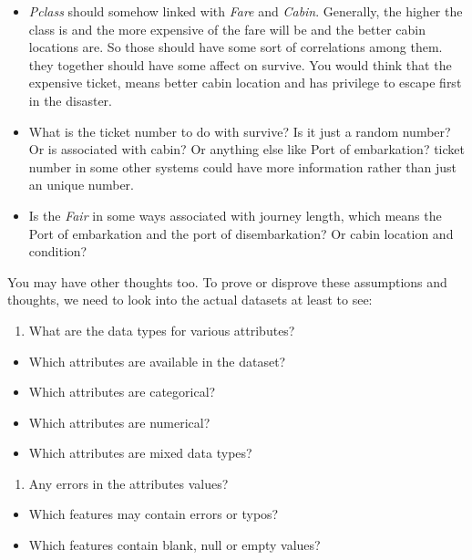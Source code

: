 \documentclass[
]{book}
\providecommand{\tightlist}{%
  \setlength{\itemsep}{0pt}\setlength{\parskip}{0pt}}
\begin{document}
\begin{itemize}
\item
  \emph{Pclass} should somehow linked with \emph{Fare} and \emph{Cabin}. Generally, the higher the class is and the more expensive of the fare will be and the better cabin locations are. So those should have some sort of correlations among them. they together should have some affect on survive. You would think that the expensive ticket, means better cabin location and has privilege to escape first in the disaster.
\item
  What is the ticket number to do with survive? Is it just a random number? Or is associated with cabin? Or anything else like Port of embarkation? ticket number in some other systems could have more information rather than just an unique number.
\item
  Is the \emph{Fair} in some ways associated with journey length, which means the Port of embarkation and the port of disembarkation? Or cabin location and condition?
\end{itemize}

You may have other thoughts too. To prove or disprove these assumptions and thoughts, we need to look into the actual datasets at least to see:

\begin{enumerate}
\def\labelenumi{\arabic{enumi}.}
\tightlist
\item
  What are the data types for various attributes?
\end{enumerate}

\begin{itemize}
\tightlist
\item
  Which attributes are available in the dataset?
\item
  Which attributes are categorical?
\item
  Which attributes are numerical?
\item
  Which attributes are mixed data types?
\end{itemize}

\begin{enumerate}
\def\labelenumi{\arabic{enumi}.}
\setcounter{enumi}{1}
\tightlist
\item
  Any errors in the attributes values?
\end{enumerate}

\begin{itemize}
\tightlist
\item
  Which features may contain errors or typos?
\item
  Which features contain blank, null or empty values?
\end{itemize}
\end{document}
